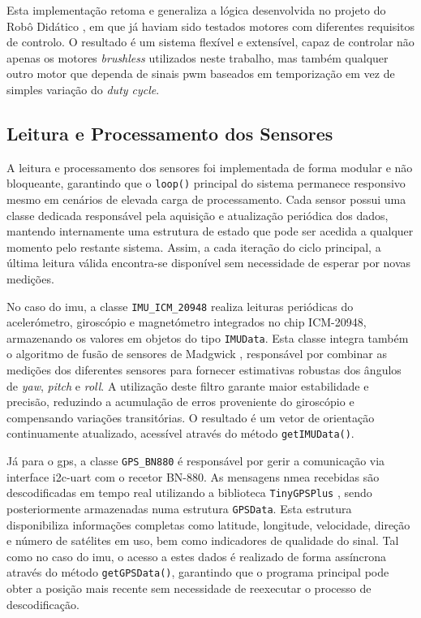 Esta implementação retoma e generaliza a lógica desenvolvida no projeto do Robô Didático \cite{didactic-robot-thesis}, em que já haviam sido testados motores com diferentes requisitos de controlo. O resultado é um sistema flexível e extensível, capaz de controlar não apenas os motores \emph{brushless} utilizados neste trabalho, mas também qualquer outro motor que dependa de sinais \gls{pwm} baseados em temporização em vez de simples variação do \emph{duty cycle}.

\subsection{Leitura e Processamento dos Sensores}
\label{subsec:processamento-sensores}

A leitura e processamento dos sensores foi implementada de forma modular e não bloqueante, garantindo que o \texttt{loop()} principal do sistema permanece responsivo mesmo em cenários de elevada carga de processamento. Cada sensor possui uma classe dedicada responsável pela aquisição e atualização periódica dos dados, mantendo internamente uma estrutura de estado que pode ser acedida a qualquer momento pelo restante sistema. Assim, a cada iteração do ciclo principal, a última leitura válida encontra-se disponível sem necessidade de esperar por novas medições.

No caso do \gls{imu}, a classe \texttt{IMU\_ICM\_20948} realiza leituras periódicas do acelerómetro, giroscópio e magnetómetro integrados no chip ICM-20948, armazenando os valores em objetos do tipo \texttt{IMUData}. Esta classe integra também o algoritmo de fusão de sensores de Madgwick \cite{madgwick-filter}, responsável por combinar as medições dos diferentes sensores para fornecer estimativas robustas dos ângulos de \emph{yaw}, \emph{pitch} e \emph{roll}. A utilização deste filtro garante maior estabilidade e precisão, reduzindo a acumulação de erros proveniente do giroscópio e compensando variações transitórias. O resultado é um vetor de orientação continuamente atualizado, acessível através do método \texttt{getIMUData()}.

Já para o \gls{gps}, a classe \texttt{GPS\_BN880} é responsável por gerir a comunicação via interface \gls{i2c}-\gls{uart} com o recetor BN-880. As mensagens \gls{nmea} recebidas são descodificadas em tempo real utilizando a biblioteca \texttt{TinyGPSPlus} \cite{tinygpsplus}, sendo posteriormente armazenadas numa estrutura \texttt{GPSData}. Esta estrutura disponibiliza informações completas como latitude, longitude, velocidade, direção e número de satélites em uso, bem como indicadores de qualidade do sinal. Tal como no caso do \gls{imu}, o acesso a estes dados é realizado de forma assíncrona através do método \texttt{getGPSData()}, garantindo que o programa principal pode obter a posição mais recente sem necessidade de reexecutar o processo de descodificação. 

